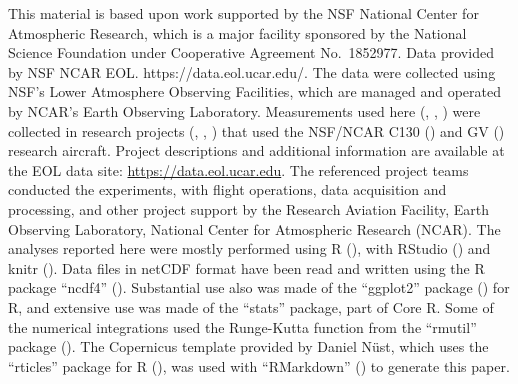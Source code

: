 \documentclass[amt, manuscript]{copernicus}
\begin{document}


\begin{acknowledgements}
This material is based upon work supported by the NSF National Center
for Atmospheric Research, which is a major facility sponsored by the
National Science Foundation under Cooperative Agreement No.~1852977.
Data provided by NSF NCAR EOL. https://data.eol.ucar.edu/. The data were
collected using NSF's Lower Atmosphere Observing Facilities, which are
managed and operated by NCAR's Earth Observing Laboratory. Measurements
used here (\citet{VOCALS2011}, \citet{SOCRATES2019}, \citet{CSET2017})
were collected in research projects (\citet{wood2011vamos},
\citet{albrecht2019CSET}, \citet{mcfarquhar2021observations}) that used
the NSF/NCAR C130 (\citet{C130}) and GV (\citet{GV}) research aircraft.
Project descriptions and additional information are available at the EOL
data site: \href{https://data.eol.ucar.edu}{https://data.eol.ucar.edu}.
The referenced project teams conducted the experiments, with flight
operations, data acquisition and processing, and other project support
by the Research Aviation Facility, Earth Observing Laboratory, National
Center for Atmospheric Research (NCAR). The analyses reported here were
mostly performed using R (\citet{Rlanguage}), with RStudio
(\citet{RStudio2021}) and knitr (\citet{Xie2015,Xie2021}). Data files in
netCDF format have been read and written using the R package ``ncdf4''
(\citet{ncdf4}). Substantial use also was made of the ``ggplot2''
package (\citet{wickham2009}) for R, and extensive use was made of the
``stats'' package, part of Core R. Some of the numerical integrations
used the Runge-Kutta function from the ``rmutil'' package
(\citet{runge.kutta}). The Copernicus template provided by Daniel Nüst,
which uses the ``rticles'' package for R (\citet{rticles}), was used
with ``RMarkdown'' (\citet{XieEtAl2018RMarkdown,Allaire2026}) to
generate this paper.
\end{acknowledgements}

\end{document}
